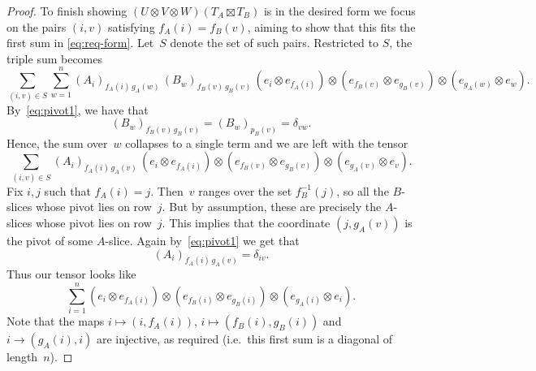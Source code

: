 \documentclass[10pt,a4paper]{amsart}
\newcommand{\beqn}{\begin{equation*}}
\newcommand{\eeqn}{\end{equation*}}
\begin{document}
\begin{proof}
To finish showing $(U\otimes V\otimes W)(T_A\boxtimes T_B)$ is in the desired form we focus on the pairs $(i,v)$ satisfying $f_A(i) = f_B(v)$, aiming to show that this fits the first sum in \eqref{eq:req-form}. 
Let~$S$ denote the set of such pairs.
Restricted to $S$, the triple sum becomes
\beqn
\sum_{(i,v)\in S}\sum_{w=1}^n 
(A_i)_{f_A(i)\,g_A(w)}\, (B_w)_{f_B(v)\,g_B(v)}\, 
(e_i\otimes e_{f_A(i)})\otimes (e_{f_B(v)}\otimes e_{g_B(v)})\otimes (e_{g_A(w)}\otimes e_w).
\eeqn
By~\eqref{eq:pivot1}, we have that 
\beqn
(B_w)_{f_B(v)\,g_B(v)} = (B_w)_{p_B(v)} = \delta_{vw}.
\eeqn
Hence, the sum over~$w$ collapses to a single term and we are left with the tensor 
\beqn
\sum_{(i,v)\in S}
(A_i)_{f_A(i)\,g_A(v)}\, 
(e_i\otimes e_{f_A(i)})\otimes (e_{f_B(v)}\otimes e_{g_B(v)})\otimes (e_{g_A(v)}\otimes e_v).
\eeqn
Fix $i,j$ such that $f_A(i) = j$.
Then~$v$ ranges over the set $f_B^{-1}(j)$, so all the $B$-slices whose pivot lies on row~$j$.
But by assumption, these are precisely the $A$-slices whose pivot lies on row~$j$.
This implies that the coordinate $(j,g_A(v))$ is the pivot of some $A$-slice.
Again by~\eqref{eq:pivot1} we  get that
\beqn
(A_i)_{f_A(i)\,g_A(v)} = \delta_{iv}.
\eeqn
Thus our tensor looks like
\beqn
\sum_{i=1}^n 
(e_i\otimes e_{f_A(i)})\otimes (e_{f_B(i)}\otimes e_{g_B(i)})\otimes (e_{g_A(i)}\otimes e_i).
\eeqn
Note that the maps $i \mapsto (i, f_A(i))$, $i \mapsto (f_B(i), g_B(i))$ and $i \to (g_A(i), i)$ are injective, as required
(i.e.\ this first sum is a diagonal of length~$n$).
\end{proof}
\end{document}
